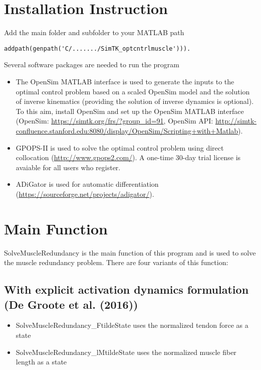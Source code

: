 \documentclass[a4paper,oneside,11pt]{article}
\begin{document}
\section{Installation Instruction}

Add the main folder and subfolder to your MATLAB path 
\begin{lstlisting}
addpath(genpath('C/......./SimTK_optcntrlmuscle'))).
\end{lstlisting}

Several software packages are needed to run the program
\begin{itemize}
	\item The OpenSim MATLAB interface is used to generate the inputs to the optimal control problem based on a scaled OpenSim model and the solution of inverse kinematics (providing the solution of inverse dynamics is optional). To this aim, install OpenSim and set up the OpenSim MATLAB interface (OpenSim: \url{https://simtk.org/frs/?group_id=91}, OpenSim API: \url{http://simtk-confluence.stanford.edu:8080/display/OpenSim/Scripting+with+Matlab}).
	\item GPOPS-II is used to solve the optimal control problem using direct collocation (\url{http://www.gpops2.com/}). A one-time 30-day trial license is avaiable for all users who register.
	\item ADiGator is used for automatic differentiation (\url{https://sourceforge.net/projects/adigator/}).
\end{itemize}

\section{Main Function}

SolveMuscleRedundancy is the main function of this program and is used to solve the muscle redundancy problem. There are four variants of this function:

\subsection{With explicit activation dynamics formulation (De Groote et al. (2016))}

\begin{itemize}
\item SolveMuscleRedundancy_FtildeState uses the normalized tendon force as a state
\item SolveMuscleRedundancy_lMtildeState uses the normalized muscle fiber length as a state
\end{itemize}
\end{document}
